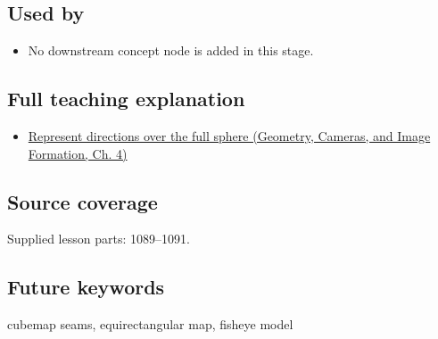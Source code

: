 \subsection{Used by}\label{appendix-fc99ad39f351-used-by}

\begin{itemize}
\tightlist
\item
  No downstream concept node is added in this stage.
\end{itemize}

\subsection{Full teaching explanation}\label{appendix-fc99ad39f351-full-teaching-explanation}

\begin{itemize}
\tightlist
\item
  \href{../03-Geometry-Cameras-and-Image-Formation/main.pdf\#nameddest=02-foundations-ii-ch035-represent-directions-over-the-full-sphere}{Represent directions over the full sphere (Geometry, Cameras, and Image Formation, Ch. 4)}
\end{itemize}

\subsection{Source coverage}\label{appendix-fc99ad39f351-source-coverage}

Supplied lesson parts: 1089--1091.

\subsection{Future keywords}\label{appendix-fc99ad39f351-future-keywords}

cubemap seams, equirectangular map, fisheye model
